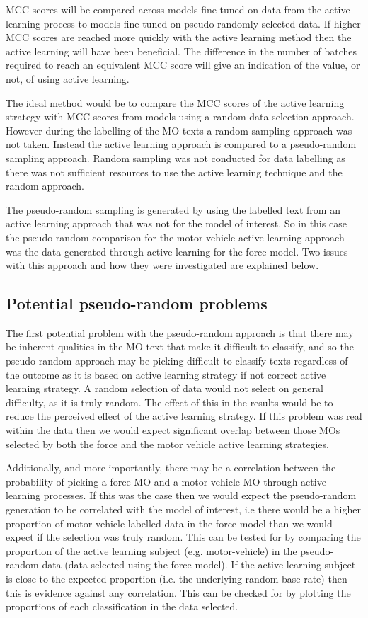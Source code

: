 MCC scores will be compared across models fine-tuned on data from the active learning process to models fine-tuned on pseudo-randomly selected data. If higher MCC scores are reached more quickly with the active learning method then the active learning will have been beneficial. The difference in the number of batches required to reach an equivalent MCC score will give an indication of the value, or not, of using active learning. 

The ideal method would be to compare the MCC scores of the active learning strategy with MCC scores from models using a random data selection approach. However during the labelling of the MO texts a random sampling approach was not taken.  Instead the active learning approach is compared to a pseudo-random sampling approach. Random sampling was not conducted for data labelling as there was not sufficient resources to use the active learning technique and the random approach.

The pseudo-random sampling is generated by using the labelled text from an active learning approach that was not for the model of interest. So in this case the pseudo-random comparison for the motor vehicle active learning approach was the data generated through active learning for the force model. Two issues with this approach and how they were investigated are explained below.

\subsection{Potential pseudo-random problems}
The first potential problem with the pseudo-random approach is that there may be inherent qualities in the MO text that make it difficult to classify, and so the pseudo-random approach may be picking difficult to classify texts regardless of the outcome as it is based on  active learning strategy if not  correct active learning strategy. A random selection of data would not select on general difficulty, as it is truly random. The effect of this in the results would be to reduce the perceived effect of the active learning strategy. If this problem was real within the data then we would expect significant overlap between those MOs selected by both the force and the motor vehicle active learning strategies. 

Additionally, and more importantly, there may be a correlation between the probability of picking a force MO and a motor vehicle MO through active learning processes. If this was the case then we would expect the pseudo-random generation to be correlated with the model of interest, i.e there would be a higher proportion of motor vehicle labelled data in the force model than we would expect if the selection was truly random. This can be tested for by comparing the proportion of the active learning subject (e.g. motor-vehicle) in the pseudo-random data (data selected using the force model). If the active learning subject is close to the expected proportion (i.e. the underlying random base rate) then this is evidence against any correlation. This can be checked for by plotting the proportions of each classification in the data selected.  

